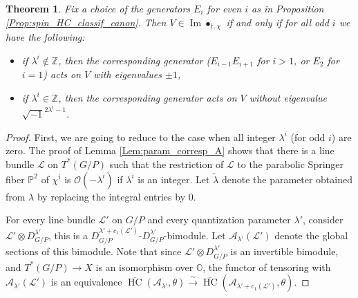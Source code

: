 \documentclass[12pt]{amsart}
\newcommand{\A}{\mathcal{A}}
\newcommand{\Orb}{\mathbb{O}}
\newcommand{\Z}{\mathbb{Z}}
\newcommand{\HC}{\operatorname{HC}}
\newtheorem{Thm}{Theorem}[subsection]
\theoremstyle{definition}
\numberwithin{equation}{section}
\begin{document}
\begin{Thm}\label{Thm:spin_HC_classif_general}
Fix a choice of the generators $E_i$ for even  $i$ as in Proposition \ref{Prop:spin_HC_classif_canon}.
Then $V\in \operatorname{Im}\bullet_{\dagger,\chi}$ if and only if for all odd $i$ we have the following:
\begin{itemize}
\item if $\lambda^i\not\in \Z$, then the corresponding generator ($E_{i-1}E_{i+1}$ for $i>1$, or
$E_2$ for $i=1$) acts on $V$ with eigenvalues $\pm 1$,
\item if  $\lambda^i\in \Z$, then the corresponding generator acts on $V$ without eigenvalue
$\sqrt{-1}^{2\lambda^i-1}$.
\end{itemize}
\end{Thm}
\begin{proof}
First, we are going to reduce to the case when all integer $\lambda^i$ (for odd $i$) are zero.
The proof of Lemma \ref{Lem:param_corresp_A} shows that there is a line bundle $\mathcal{L}$
on $T^*(G/P)$ such that the restriction of $\mathcal{L}$ to the parabolic Springer fiber $\mathbb{P}^2$
of $\chi^i$ is $\mathcal{O}(-\lambda^i)$ if $\lambda^i$ is an integer. Let $\tilde{\lambda}$ denote the parameter obtained from $\lambda$ by replacing the integral entries by $0$.

For every line bundle
$\mathcal{L}'$ on $G/P$ and every quantization parameter $\lambda'$, consider
$\mathcal{L}'\otimes D^{\lambda'}_{G/P}$, this is a $D^{\lambda'+c_1(\mathcal{L}')}_{G/P}$-$D^{\lambda'}_{G/P}$-bimodule. Let $\A_{\lambda'}(\mathcal{L}')$
denote the global sections of this bimodule. Note that since $\mathcal{L}'\otimes D^{\lambda'}_{G/P}$ is an invertible
bimodule, and $T^*(G/P)\rightarrow X$ is an isomorphism over $\Orb$, the functor of tensoring
with $\A_{\lambda'}(\mathcal{L}')$ is an equivalence $\overline{\HC}(\A_{\lambda'},\theta)\xrightarrow{\sim} \overline{\HC}(\A_{\lambda'+c_1(\mathcal{L}')},\theta)$.


\end{proof}
\end{document}
